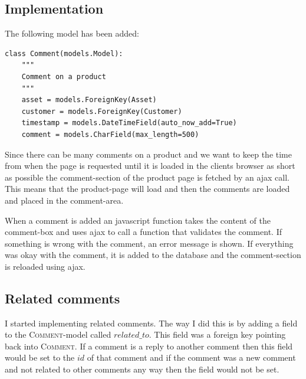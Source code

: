 \documentclass[12pt, a4paper,titlepage]{article}
\begin{document}
\subsection{Implementation}
The following model has been added:
\begin{lstlisting}
class Comment(models.Model):
    """ 
    Comment on a product
    """
    asset = models.ForeignKey(Asset)
    customer = models.ForeignKey(Customer)
    timestamp = models.DateTimeField(auto_now_add=True)
    comment = models.CharField(max_length=500)
\end{lstlisting}
Since there can be many comments on a product and we want to keep the time
from when the page is requested until it is loaded in the clients browser as
short as possible the comment-section of the product page is fetched by an
ajax call. This means that the product-page will load and then the comments
are loaded and placed in the comment-area.

When a comment is added an javascript function takes the content of the
comment-box and uses ajax to call a function that validates the comment.
If something is wrong with the comment, an error message is shown.
If everything was okay with the comment, it is added to the database and the
comment-section is reloaded using ajax.

\subsection{Related comments}
\label{sec:related_comments}
I started implementing related comments. 
The way I did this is by adding a field to the \textsc{Comment}-model called
$related\_to$. This field was a foreign key pointing back into \textsc{Comment}.
If a comment is a reply to another comment then this field would be set to the
$id$ of that comment and if the comment was a new comment and not related
to other comments any way then the field would not be set.
\end{document}

